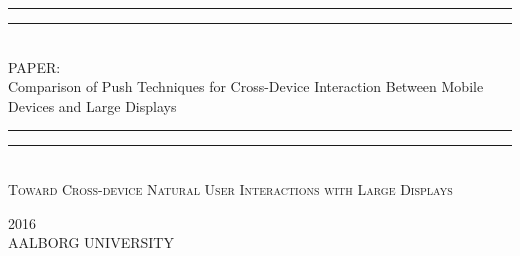 
\begin{dummy}

	\textheight
	\centering
	\vspace*{\baselineskip}
	\rule{\textwidth}{1.6pt}\vspace*{-\baselineskip}\vspace*{2pt}
	\rule{\textwidth}{0.4pt}\\[\baselineskip]
	{\LARGE PAPER: \\ \hfill \break Comparison of Push Techniques for Cross-Device Interaction Between Mobile Devices and Large Displays}\\[0.2\baselineskip]
	\rule{\textwidth}{0.4pt}\vspace*{-\baselineskip}\vspace{3.2pt}
	\rule{\textwidth}{1.6pt}\\[\baselineskip]
	\scshape
	{ \large Toward Cross-device Natural User Interactions with Large Displays } \par
	\vspace*{2\baselineskip}
	\vspace*{2\baselineskip}
	\vspace*{2\baselineskip}
	\vspace*{2\baselineskip}
		
		
	\begin{newab}
		
	\end{newab}

	\vspace*{2\baselineskip}
	\vspace*{2\baselineskip}
	\vspace*{2\baselineskip}
	\vspace*{2\baselineskip}
		{\scshape 2016} \\
		{\large AALBORG UNIVERSITY}\par
	
\end{dummy}